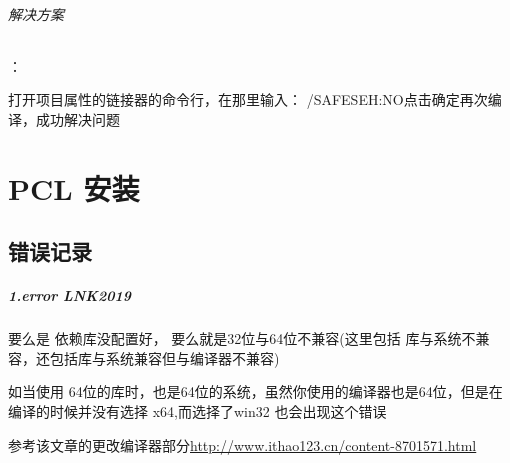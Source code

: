 \documentclass[UTF8,a4paper,12pt]{ctexbook}
\begin{document}
		\subparagraph{解决方案}：
		
		打开项目属性的链接器的命令行，在那里输入： /SAFESEH:NO点击确定再次编译，成功解决问题


\chapter{PCL  安装}
	\section{错误记录}
		\paragraph{1.error LNK2019} 要么是 依赖库没配置好， 要么就是32位与64位不兼容(这里包括 库与系统不兼容，还包括库与系统兼容但与编译器不兼容)
		
		如当使用 64位的库时，也是64位的系统，虽然你使用的编译器也是64位，但是在编译的时候并没有选择 x64,而选择了win32 也会出现这个错误
		
		参考该文章的更改编译器部分\url{http://www.ithao123.cn/content-8701571.html}
\end{document}
